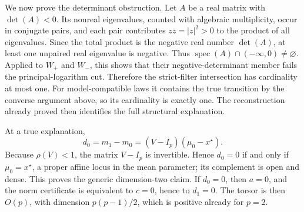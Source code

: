 We now prove the determinant obstruction.  Let \(A\) be a real matrix with \(\det(A)<0\).  Its nonreal eigenvalues, counted with algebraic multiplicity, occur in conjugate pairs, and each pair contributes \(z\overline z=|z|^2>0\) to the product of all eigenvalues.  Since the total product is the negative real number \(\det(A)\), at least one unpaired real eigenvalue is negative.  Thus \(\operatorname{spec}(A)\cap(-\infty,0)\ne\varnothing\).  Applied to \(W_+\) and \(W_-\), this shows that their negative-determinant member fails the principal-logarithm cut.  Therefore the strict-filter intersection has cardinality at most one.  For model-compatible laws it contains the true transition by the converse argument above, so its cardinality is exactly one.  The reconstruction already proved then identifies the full structural explanation.

At a true explanation,
\[
 d_0=m_1-m_0=(V-I_p)(\mu_0-x^\star).
\]
Because \(\rho(V)<1\), the matrix \(V-I_p\) is invertible.  Hence \(d_0=0\) if and only if \(\mu_0=x^\star\), a proper affine locus in the mean parameter; its complement is open and dense.  This proves the generic dimension-two claim.  If \(d_0=0\), then \(a=0\), and the norm certificate is equivalent to \(c=0\), hence to \(d_1=0\).  The torsor is then \(O(p)\), with dimension \(p(p-1)/2\), which is positive already for \(p=2\).

